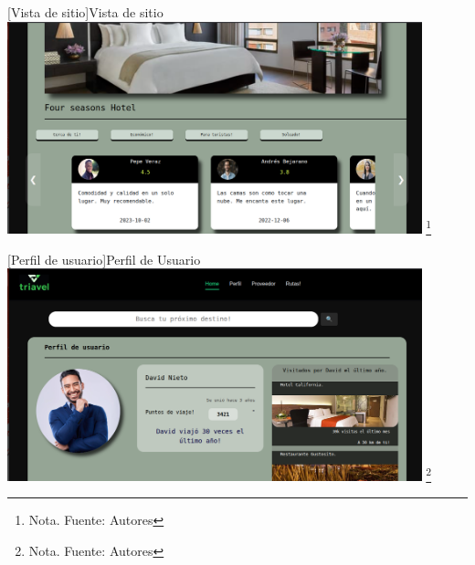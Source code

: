        \vspace{2mm}
    \begin{minipage}{0.9\textwidth}
    \centering
    [{Vista de sitio}]{Vista de sitio}
    \label{prot11}
    \includegraphics[width=0.9\textwidth]{Content/Images/VistaDeSitio.png}
    \footnote{Nota. \textup{Fuente: Autores}}
    \end{minipage}

      \vspace{2mm}
    \begin{minipage}{0.9\textwidth}
    \centering
    [{Perfil de usuario}]{Perfil de Usuario}
    \label{prot12}
    \includegraphics[width=0.9\textwidth]{Content/Images/UserProfile.png}
    \footnote{Nota. \textup{Fuente: Autores}}
    \end{minipage}

    

    
    